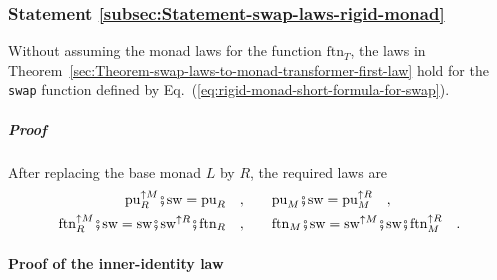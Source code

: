 \subsubsection{Statement \label{subsec:Statement-swap-laws-rigid-monad}\ref{subsec:Statement-swap-laws-rigid-monad}}

Without assuming the monad laws for the function $\text{ftn}_{T}$,
the laws in Theorem~\ref{sec:Theorem-swap-laws-to-monad-transformer-first-law}
hold for the \lstinline!swap!
function defined by Eq.~(\ref{eq:rigid-monad-short-formula-for-swap}).

\subparagraph{Proof}

After replacing the base monad $L$ by $R$, the required laws are
\begin{align*}
\text{pu}_{R}^{\uparrow M}\bef\text{sw}=\text{pu}_{R}\quad, & \quad\quad\text{pu}_{M}\bef\text{sw}=\text{pu}_{M}^{\uparrow R}\quad,\\
\text{ftn}_{R}^{\uparrow M}\bef\text{sw}=\text{sw}\bef\text{sw}^{\uparrow R}\bef\text{ftn}_{R}\quad, & \quad\quad\text{ftn}_{M}\bef\text{sw}=\text{sw}^{\uparrow M}\bef\text{sw}\bef\text{ftn}_{M}^{\uparrow R}\quad.
\end{align*}


\paragraph{Proof of the inner-identity law}

